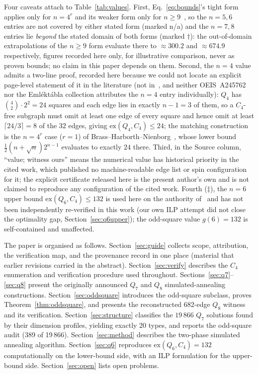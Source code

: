 \documentclass[12pt,a4paper]{article}
\theoremstyle{definition}
\newcommand{\ex}{\mathrm{ex}}
\begin{document}
Four caveats attach to Table~\ref{tab:values}. First,
Eq.~\eqref{eq:bounds}'s tight form applies only for $n=4^r$ and its weaker
form only for $n\ge9$~\cite{BHN95}, so the $n=5,6$ entries are not covered
by either stated form (marked n/a) and the $n=7,8$ entries lie \emph{beyond}
the stated domain of both forms (marked $\dagger$): the out-of-domain
extrapolations of the $n\ge9$ form evaluate there to $\approx300.2$ and
$\approx674.9$ respectively, figures recorded here only, for illustrative
comparison, never as proven bounds; no claim in this paper depends on them.
Second, the $n=4$ value admits a two-line proof, recorded here because we
could not locate an explicit page-level statement of it in the literature
(not in~\cite{Chu92}, and neither OEIS~A245762 nor the Emléktábla
collection attributes the $n=4$ entry individually): $Q_4$ has
$\binom42\cdot2^2=24$ squares and each edge lies in exactly $n-1=3$ of
them, so a $C_4$-free subgraph must omit at least one edge of every square
and hence omit at least $\lceil24/3\rceil=8$ of the $32$ edges, giving
$\ex(Q_4,C_4)\le24$; the matching construction is the $n=4^r$ case
($r=1$) of Brass--Harborth--Nienborg~\cite{BHN95}, whose lower bound
$\tfrac12(n+\sqrt n)2^{n-1}$ evaluates to exactly $24$ there. Third, in the Source column, ``value; witness ours''
means the numerical value has historical priority in the cited work, which
published no machine-readable edge list or spin configuration for it; the
explicit certificate released here is the present author's own and is not
claimed to reproduce any configuration of the cited work. Fourth
($\ddagger$), the $n=6$ upper bound $\ex(Q_6,C_4)\le132$ is used here on
the authority of~\cite{HN94} and has not been independently re-verified in
this work (our own ILP attempt did not close the optimality gap,
Section~\ref{sec:q6upper}); the odd-square value $g(6)=132$ is
self-contained and unaffected.

The paper is organised as follows.
Section~\ref{sec:guide} collects scope, attribution, the verification map,
and the provenance record in one place (material that earlier revisions
carried in the abstract).
Section~\ref{sec:verify} describes the $C_4$ enumeration and verification
procedure used throughout.
Sections~\ref{sec:q7}--\ref{sec:q8} present the originally announced $Q_7$
and $Q_8$ simulated-annealing constructions.
Section~\ref{sec:oddsquare} introduces the odd-square subclass, proves
Theorem~\ref{thm:oddsquare}, and presents the reconstructed 682-edge $Q_8$
witness and its verification.
Section~\ref{sec:structure} classifies the $19\,866$ $Q_7$ solutions found
by their dimension profiles, yielding exactly 20 types, and reports the
odd-square audit (389 of 19\,866).
Section~\ref{sec:method} describes the two-phase simulated annealing algorithm.
Section~\ref{sec:q6} reproduces $\ex(Q_6,C_4)=132$ computationally on the
lower-bound side, with an ILP formulation for the upper-bound side.
Section~\ref{sec:open} lists open problems.
\end{document}
